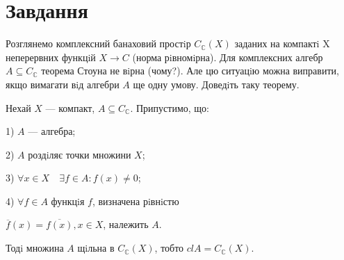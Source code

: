 
\chapter{Завдання \theHchapter}

\begin{tcolorbox}[title=Завдання]
    Розглянемо комплексний банаховий простiр 
    $C_{\mathbb{C}}(X)$ заданих на компактi X неперервних
    функцiй $X \rightarrow C$ (норма рiвномiрна). 
    Для комплексних алгебр $A \subseteq C_{\mathbb{C}}$ 
    теорема Стоуна не вiрна (чому?). 
    Але цю ситуацiю можна виправити, якщо вимагати вiд алгебри $A$ 
    ще одну умову. Доведiть таку теорему.
\end{tcolorbox}


\begin{tcolorbox}[title=Теорема Cтоуна для комплексних алгебр]
    Нехай $X$ — компакт, $A \subseteq C_{\mathbb{C}}$. 
    Припустимо, що:


    1) $A$ — алгебра;


    2) $A$ роздiляє точки множини $X$;


    3) $\forall x \in X \quad \exists f \in A: f(x) \neq 0$;


    4) $\forall f \in A$ функцiя $f$, визначена рiвнiстю
    
    
    \quad $\overline{f}(x) = \overline{f(x)}, x \in X$, належить $A$.


    Тодi множина $A$ щiльна в $C_{\mathbb{C}}(X)$, 
    тобто $clA = C_{\mathbb{C}}(X)$.
\end{tcolorbox}

